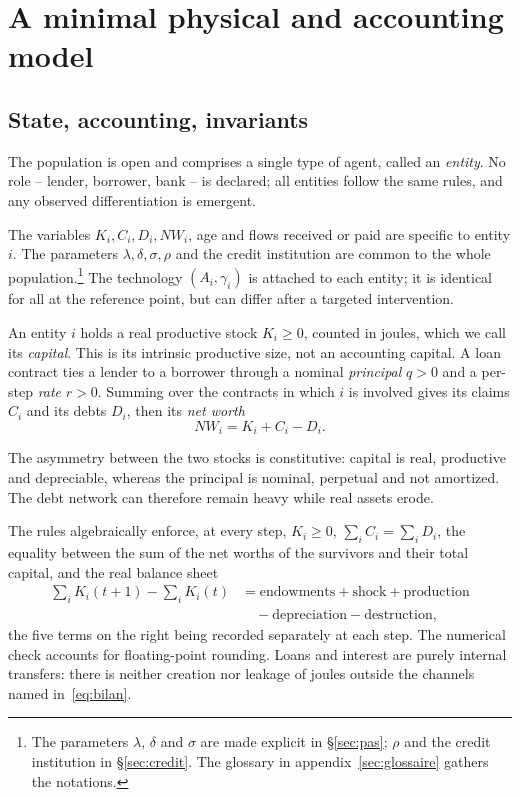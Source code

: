 \section{A minimal physical and accounting model}\label{sec:modele}


\subsection{State, accounting, invariants}

The population is open and comprises a single type of agent, called an
\emph{entity}. No role -- lender, borrower, bank -- is declared;
all entities follow the same rules, and any observed differentiation
is emergent.

The variables $K_i,C_i,D_i,NW_i$, age and flows received or paid are
specific to entity $i$. The parameters $\lambda,\delta,\sigma,\rho$ and
the credit institution are common to the whole population.\footnote{The
parameters $\lambda$, $\delta$ and $\sigma$ are made explicit in
\S\ref{sec:pas}; $\rho$ and the credit institution in \S\ref{sec:credit}.
The glossary in appendix~\ref{sec:glossaire} gathers the notations.} The technology
$(A_i,\gamma_i)$ is attached to each entity; it is identical for all
at the reference point, but can differ after a targeted intervention.

An entity $i$ holds a real productive stock $K_i \ge 0$, counted in
joules, which we call its \emph{capital}. This is its intrinsic
productive size, not an accounting capital. A loan contract ties a
lender to a borrower through a nominal \emph{principal} $q > 0$ and a
per-step \emph{rate} $r > 0$. Summing over the contracts in which $i$
is involved gives its claims $C_i$ and its debts $D_i$, then its
\emph{net worth}
\begin{equation}
NW_i = K_i + C_i - D_i .
\label{eq:nw}
\end{equation}

The asymmetry between the two stocks is constitutive: capital is real,
productive and depreciable, whereas the principal is nominal, perpetual
and not amortized. The debt network can therefore remain heavy while
real assets erode.

The rules algebraically enforce, at every step, $K_i \ge 0$,
$\sum_i C_i = \sum_i D_i$, the equality between the sum of the net
worths of the survivors and their total capital, and the real balance
sheet
\begin{equation}
\begin{split}
\sum_i K_i(t{+}1) - \sum_i K_i(t) &= \text{endowments} + \text{shock} + \text{production}\\
&\quad - \text{depreciation} - \text{destruction},
\end{split}
\label{eq:bilan}
\end{equation}
the five terms on the right being recorded separately at each step.
The numerical check accounts for floating-point rounding.
Loans and interest are purely internal transfers: there is neither
creation nor leakage of joules outside the channels named
in~\eqref{eq:bilan}.

